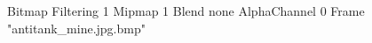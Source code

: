 {Bitmap
	{Filtering 1}
	{Mipmap 1}
	{Blend none}
	{AlphaChannel 0}
	{Frame "antitank_mine.jpg.bmp"}
}
